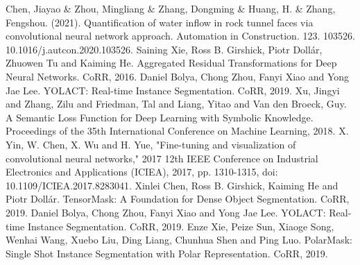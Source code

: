 \documentclass[10pt,twocolumn,letterpaper]{article}
\begin{document}
\begin{thebibliography}{1}
Chen, Jiayao \& Zhou, Mingliang \& Zhang, Dongming \& Huang, H. \& Zhang, Fengshou. (2021).
Quantification of water inflow in rock tunnel faces via convolutional neural network approach. Automation in Construction. 123. 103526. 10.1016/j.autcon.2020.103526. 
Saining Xie, Ross B. Girshick, Piotr Doll\'ar, Zhuowen Tu and Kaiming He.
Aggregated Residual Transformations for Deep Neural Networks. CoRR, 2016.
Daniel Bolya, Chong Zhou, Fanyi Xiao and Yong Jae Lee.
YOLACT: Real-time Instance Segmentation. CoRR, 2019.
Xu, Jingyi and Zhang, Zilu and Friedman, Tal and Liang, Yitao and Van den Broeck, Guy.
A Semantic Loss Function for Deep Learning with Symbolic Knowledge. Proceedings of the 35th International Conference on Machine Learning, 2018.
X. Yin, W. Chen, X. Wu and H. Yue, "Fine-tuning and visualization of convolutional neural networks," 2017 12th IEEE Conference on Industrial Electronics and Applications (ICIEA), 2017, pp. 1310-1315, doi: 10.1109/ICIEA.2017.8283041.
Xinlei Chen, Ross B. Girshick, Kaiming He and Piotr Doll\'ar.
TensorMask: A Foundation for Dense Object Segmentation. CoRR, 2019.
Daniel Bolya, Chong Zhou, Fanyi Xiao and Yong Jae Lee.
YOLACT: Real-time Instance Segmentation. CoRR, 2019.
Enze Xie, Peize Sun, Xiaoge Song, Wenhai Wang, Xuebo Liu, Ding Liang, Chunhua Shen and Ping Luo.
PolarMask: Single Shot Instance Segmentation with Polar Representation. CoRR, 2019.

\end{thebibliography}
\end{document}

